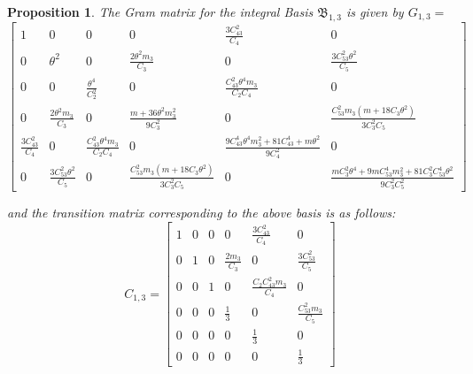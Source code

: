 \documentclass[table]{amsart}
\newtheorem{proposition}[theorem]{Proposition}
\numberwithin{equation}{section}
\begin{document}
\begin{proposition}
   The Gram matrix for the integral Basis $\mathfrak{B}_{1, 3}$ is given by $G_{1,3}=$
   \[
\begin{bmatrix}
1 
& 0 
& 0 
& 0 
& \tfrac{3C_{43}^2}{C_4} 
& 0 \\[6pt]

0 
& \theta^2 
& 0 
& \tfrac{2\theta^2 m_3}{ C_3} 
& 0 
& \tfrac{3C_{53}^2 \theta^2}{ C_5} \\[8pt]

0 
& 0 
& \tfrac{\theta^4}{C_2^2} 
& 0 
& \tfrac{C_{43}^2 \theta^4 m_3}{C_2 C_4} 
& 0 \\[8pt]

0 
& \tfrac{2\theta^2 m_3}{ C_3} 
& 0 
& \tfrac{m  + 36\theta^2 m_3^2}{9  C_3^2} 
& 0 
& \tfrac{C_{53}^2 m_3 (m  + 18 C_3 \theta^2)}{3  C_3^2 C_5} \\[8pt]

\tfrac{3C_{43}^2}{C_4} 
& 0 
& \tfrac{C_{43}^2 \theta^4 m_3}{C_2 C_4} 
& 0 
& \tfrac{9 C_{43}^4 \theta^4 m_3^2 + 81 C_{43}^4 + m \theta^2}{9 C_4^2} 
& 0 \\[8pt]

0 
& \tfrac{3C_{53}^2 \theta^2}{ C_5} 
& 0 
& \tfrac{C_{53}^2 m_3 (m  + 18 C_3 \theta^2)}{3  C_3^2 C_5} 
& 0 
& \tfrac{m  C_3^2 \theta^4 + 9 m  C_{53}^4 m_3^2 + 81 C_3^2 C_{53}^4 \theta^2}{9  C_3^2 C_5^2}
\end{bmatrix}
\]

 and the transition matrix corresponding to the above basis is as follows:
 \[
C_{1,3}=\begin{bmatrix}
1 & 0 & 0 & 0 & \tfrac{3C_{43}^2}{C_4} & 0 \\[8pt]
0 & 1 & 0 & \tfrac{2m_3}{C_3} & 0 & \tfrac{3C_{53}^2}{C_5} \\[8pt]
0 & 0 & 1 & 0 & \tfrac{C_2 C_{43}^2 m_3}{C_4} & 0 \\
0 & 0 & 0 & \tfrac{1}{3} & 0 & \tfrac{C_{53}^2 m_3}{C_5} \\[8pt]
0 & 0 & 0 & 0 & \tfrac{1}{3} & 0 \\[8pt]
0 & 0 & 0 & 0 & 0 & \tfrac{1}{3}
\end{bmatrix}
\]
\end{proposition}
\end{document}
